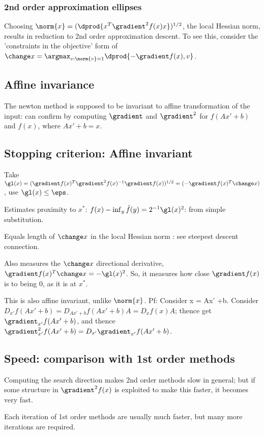 \documentclass[oneside, article]{memoir}
\begin{document}
\subsubsection{2nd order approximation ellipses}
Choosing $\norm{x} = (\dprod{x^{T} \gradient^{2}f(x)x})^{1/2}$, the local Hessian norm, results in reduction to 2nd order approximation descent. To see this, consider the 'constraints in the objective' form of $\change x = \argmax_{v: \norm{v} = 1} \dprod{-\gradient f(x), v}$.


\subsection{Affine invariance}
The newton method is supposed to be invariant to affine transformation of the input: can confirm by computing $\gradient$ and $\gradient^2$ for $f(Ax' + b)$ and $f(x)$, where $Ax' + b = x$. 

\subsection{Stopping criterion: Affine invariant }
Take $\gl(x) = (\gradient f(x)^{T} \gradient^{2}f(x)^{-1}\gradient f(x))^{1/2} = (-\gradient f(x)^{T}\change x)$, use $\gl(x) \leq \eps$.

Estimates proximity to $x^{*}$: $f(x) - \inf_y \hat{f}(y) = 2^{-1}\gl(x)^{2}$: from simple substitution.

Equals length of $\change x$ in the local Hessian norm : see steepest descent connection.

Also measures the $\change x$ directional derivative, $\gradient f(x)^{T} \change x = -\gl(x)^{2}$. So, it measures how close $\gradient f(x)$ is to being 0, as it is at $x^{*}$.

This is also affine invariant, unlike $\norm{x}$. Pf: Consider x = Ax' +b. Consider $D_{x'}f(Ax'+b) = D_{Ax'+b}f(Ax'+b)A = D_{x}f(x)A$; thence get $\gradient_{x'} f(Ax'+b)$, and thence $\gradient_{x'}^2 f(Ax'+b) = D_{x'} \gradient_{x'} f(Ax'+b)$.

\subsection{Speed: comparison with 1st order methods}
Computing the search direction makes 2nd order methods slow in general; but if some structure in $\gradient^{2}f(x)$ is exploited to make this faster, it becomes very fast.

Each iteration of 1st order methods are usually much faster, but many more iterations are required.
\end{document}

